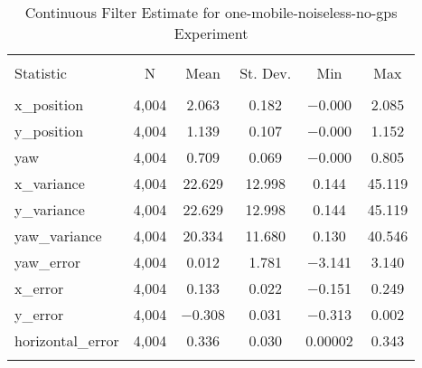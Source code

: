 
\begin{table}[h] \centering 
  \caption{Continuous Filter Estimate for one-mobile-noiseless-no-gps Experiment} 
  \label{tab:one_mobile_noiseless_no_gps_continuous_summary} 
\begin{tabular}{@{\extracolsep{5pt}}lccccc} 
\\[-1.8ex]\hline 
\hline \\[-1.8ex] 
Statistic & \multicolumn{1}{c}{N} & \multicolumn{1}{c}{Mean} & \multicolumn{1}{c}{St. Dev.} & \multicolumn{1}{c}{Min} & \multicolumn{1}{c}{Max} \\ 
\hline \\[-1.8ex] 
x\_position & 4,004 & 2.063 & 0.182 & $-$0.000 & 2.085 \\ 
y\_position & 4,004 & 1.139 & 0.107 & $-$0.000 & 1.152 \\ 
yaw & 4,004 & 0.709 & 0.069 & $-$0.000 & 0.805 \\ 
x\_variance & 4,004 & 22.629 & 12.998 & 0.144 & 45.119 \\ 
y\_variance & 4,004 & 22.629 & 12.998 & 0.144 & 45.119 \\ 
yaw\_variance & 4,004 & 20.334 & 11.680 & 0.130 & 40.546 \\ 
yaw\_error & 4,004 & 0.012 & 1.781 & $-$3.141 & 3.140 \\ 
x\_error & 4,004 & 0.133 & 0.022 & $-$0.151 & 0.249 \\ 
y\_error & 4,004 & $-$0.308 & 0.031 & $-$0.313 & 0.002 \\ 
horizontal\_error & 4,004 & 0.336 & 0.030 & 0.00002 & 0.343 \\ 
\hline \\[-1.8ex] 
\end{tabular} 
\end{table} 
